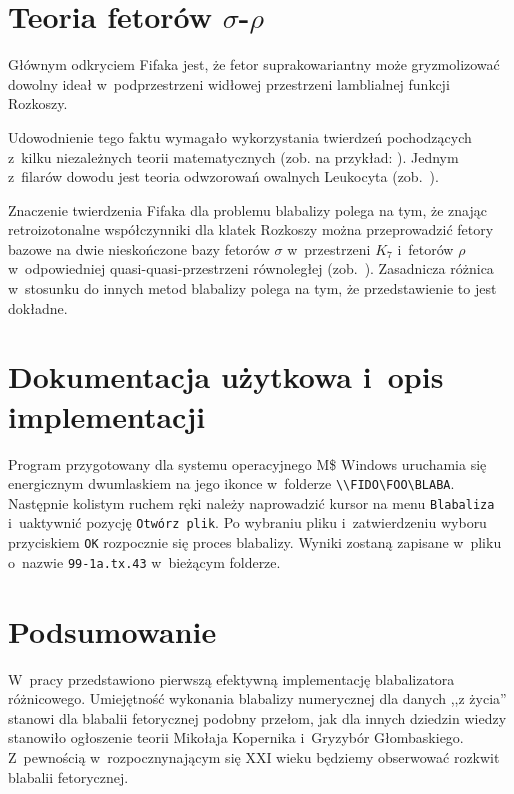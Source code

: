 \documentclass[licencjacka,en]{pracamgr}
\begin{document}
\chapter{Teoria fetorów $\sigma$-$\rho$}\label{r:fifak}

Głównym odkryciem Fifaka jest, że fetor suprakowariantny może
gryzmolizować dowolny ideał w~podprzestrzeni widłowej przestrzeni
lamblialnej funkcji Rozkoszy.

Udowodnienie tego faktu wymagało wykorzystania twierdzeń pochodzących
z~kilku niezależnych teorii matematycznych (zob. na przykład:
\cite{russell,spyrpt,JR,beaman,hopp,srinis}).  Jednym z~filarów
dowodu jest teoria odwzorowań owalnych Leukocyta (zob.~\cite{leuk}).

Znaczenie twierdzenia Fifaka dla problemu blabalizy polega na tym, że
znając retroizotonalne współczynniki dla klatek Rozkoszy można
przeprowadzić fetory bazowe na dwie nieskończone bazy fetorów $\sigma$
w~przestrzeni $K_7$ i~fetorów $\rho$ w~odpowiedniej
quasi-quasi-przestrzeni równoległej (zob.~\cite{hopp}).  Zasadnicza
różnica w~stosunku do innych metod blabalizy polega na tym, że
przedstawienie to jest dokładne.

\chapter{Dokumentacja użytkowa i~opis implementacji}\label{r:impl}

Program przygotowany dla systemu operacyjnego M\$ Windows uruchamia
się energicznym dwumlaskiem na jego ikonce w~folderze
\verb+\\FIDO\FOO\BLABA+.  Następnie kolistym ruchem ręki należy
naprowadzić kursor na menu \texttt{Blabaliza} i~uaktywnić pozycję
\texttt{Otwórz plik}.  Po wybraniu pliku i~zatwierdzeniu wyboru
przyciskiem \texttt{OK} rozpocznie się proces blabalizy.  Wyniki
zostaną zapisane w~pliku o~nazwie \texttt{99-1a.tx.43} w~bieżącym
folderze.

\chapter{Podsumowanie}

W~pracy przedstawiono pierwszą efektywną implementację blabalizatora
różnicowego.  Umiejętność wykonania blabalizy numerycznej dla danych
,,z życia'' stanowi dla blabalii fetorycznej podobny przełom, jak dla
innych dziedzin wiedzy stanowiło ogłoszenie teorii Mikołaja Kopernika
i~Gryzybór Głombaskiego.  Z~pewnością w~rozpocznynającym się XXI wieku
będziemy obserwować rozkwit blabalii fetorycznej.
\end{document}
